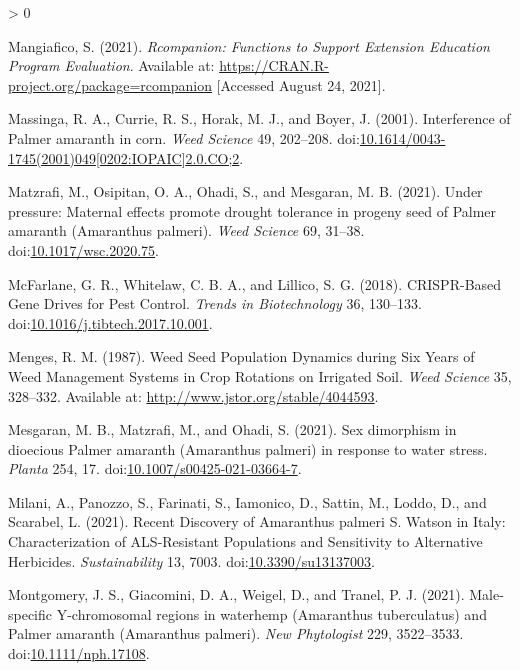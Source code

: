 \documentclass[utf8]{frontiersSCNS}
\newlength{\cslhangindent}
\newenvironment{CSLReferences}[2] %
 {%
  \setlength{\parindent}{0pt}
  \ifodd #1 \everypar{\setlength{\hangindent}{\cslhangindent}}\ignorespaces\fi
  \ifnum #2 > 0
  \setlength{\parskip}{#2\baselineskip}
  \fi
 }%
 {}
\begin{document}
\begin{CSLReferences}{1}{0}
\leavevmode\hypertarget{ref-mangiafico2021}{}%
Mangiafico, S. (2021). \emph{Rcompanion: {Functions} to {Support
Extension Education Program Evaluation}}. Available at:
\url{https://CRAN.R-project.org/package=rcompanion} {[}Accessed August
24, 2021{]}.

\leavevmode\hypertarget{ref-massinga2001}{}%
Massinga, R. A., Currie, R. S., Horak, M. J., and Boyer, J. (2001).
Interference of {Palmer} amaranth in corn. \emph{Weed Science} 49,
202--208.
doi:\href{https://doi.org/10.1614/0043-1745(2001)049\%5B0202:IOPAIC\%5D2.0.CO;2}{10.1614/0043-1745(2001)049{[}0202:IOPAIC{]}2.0.CO;2}.

\leavevmode\hypertarget{ref-matzrafi2021}{}%
Matzrafi, M., Osipitan, O. A., Ohadi, S., and Mesgaran, M. B. (2021).
Under pressure: Maternal effects promote drought tolerance in progeny
seed of {Palmer} amaranth ({Amaranthus} palmeri). \emph{Weed Science}
69, 31--38.
doi:\href{https://doi.org/10.1017/wsc.2020.75}{10.1017/wsc.2020.75}.

\leavevmode\hypertarget{ref-mcfarlane2018}{}%
McFarlane, G. R., Whitelaw, C. B. A., and Lillico, S. G. (2018).
{CRISPR}-{Based Gene Drives} for {Pest Control}. \emph{Trends in
Biotechnology} 36, 130--133.
doi:\href{https://doi.org/10.1016/j.tibtech.2017.10.001}{10.1016/j.tibtech.2017.10.001}.

\leavevmode\hypertarget{ref-menges1987}{}%
Menges, R. M. (1987). Weed {Seed Population Dynamics} during {Six Years}
of {Weed Management Systems} in {Crop Rotations} on {Irrigated Soil}.
\emph{Weed Science} 35, 328--332. Available at:
\url{http://www.jstor.org/stable/4044593}.

\leavevmode\hypertarget{ref-mesgaran2021}{}%
Mesgaran, M. B., Matzrafi, M., and Ohadi, S. (2021). Sex dimorphism in
dioecious {Palmer} amaranth ({Amaranthus} palmeri) in response to water
stress. \emph{Planta} 254, 17.
doi:\href{https://doi.org/10.1007/s00425-021-03664-7}{10.1007/s00425-021-03664-7}.

\leavevmode\hypertarget{ref-milani2021}{}%
Milani, A., Panozzo, S., Farinati, S., Iamonico, D., Sattin, M., Loddo,
D., and Scarabel, L. (2021). Recent {Discovery} of {Amaranthus} palmeri
{S}. {Watson} in {Italy}: {Characterization} of {ALS}-{Resistant
Populations} and {Sensitivity} to {Alternative Herbicides}.
\emph{Sustainability} 13, 7003.
doi:\href{https://doi.org/10.3390/su13137003}{10.3390/su13137003}.

\leavevmode\hypertarget{ref-montgomery2021}{}%
Montgomery, J. S., Giacomini, D. A., Weigel, D., and Tranel, P. J.
(2021). Male-specific {Y}-chromosomal regions in waterhemp ({Amaranthus}
tuberculatus) and {Palmer} amaranth ({Amaranthus} palmeri). \emph{New
Phytologist} 229, 3522--3533.
doi:\href{https://doi.org/10.1111/nph.17108}{10.1111/nph.17108}.


\end{CSLReferences}
\end{document}
